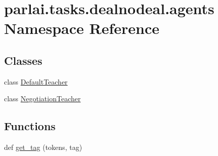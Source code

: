 \hypertarget{namespaceparlai_1_1tasks_1_1dealnodeal_1_1agents}{}\section{parlai.\+tasks.\+dealnodeal.\+agents Namespace Reference}
\label{namespaceparlai_1_1tasks_1_1dealnodeal_1_1agents}
\subsection*{Classes}
\begin{DoxyCompactItemize}
\item 
class \hyperlink{classparlai_1_1tasks_1_1dealnodeal_1_1agents_1_1DefaultTeacher}{Default\+Teacher}
\item 
class \hyperlink{classparlai_1_1tasks_1_1dealnodeal_1_1agents_1_1NegotiationTeacher}{Negotiation\+Teacher}
\end{DoxyCompactItemize}
\subsection*{Functions}
\begin{DoxyCompactItemize}
\item 
def \hyperlink{namespaceparlai_1_1tasks_1_1dealnodeal_1_1agents_a7a1e5d8435af234bbf07491e866bb1fd}{get\+\_\+tag} (tokens, tag)
\end{DoxyCompactItemize}

